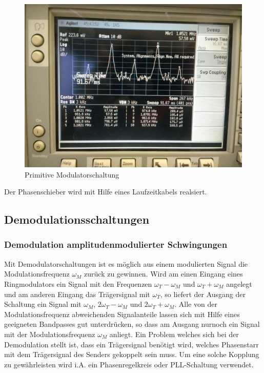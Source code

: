 \begin{figure}
	\centering
	\includegraphics[width=\textwidth]{img/Aufgabenteil_b.jpg}
	\caption{Primitive Modulatorschaltung}
	\label{abb:ringMod}
\end{figure}

Der Phasenschieber wird mit Hilfe eines Laufzeitkabels realsiert.

\subsection{Demodulationsschaltungen}
\subsubsection{Demodulation amplitudenmodulierter Schwingungen}
Mit Demodulatorschaltungen ist es möglich aus einem modulierten Signal die Modulationsfrequenz $\omega_M$ zurück zu gewinnen.
Wird am einen Eingang eines Ringmodulators ein Signal mit den Frequenzen $\omega_T - \omega_M$ und $\omega_T + \omega_M$ angelegt und am anderen Eingang das Trägersignal mit $\omega_T$, so liefert der Ausgang der Schaltung ein Signal mit
$\omega_M$, $2\omega_T - \omega_M$ und $2\omega_T + \omega_M$. Alle von der Modulationsfrequenz abweichenden Signalanteile lassen sich mit Hilfe eines geeigneten Bandpasses gut unterdrücken, so dass am Ausgang nurnoch ein Signal mit der Modulationsfrequenz $\omega_M$ anliegt. Ein Problem welches sich bei der Demodulation stellt ist, dass ein Trägersignal benötigt wird, welches Phasenstarr mit dem Trägersignal des Senders gekoppelt sein muss. Um eine solche Kopplung zu gewährleisten wird i.A. ein Phasenregelkreis oder PLL-Schaltung verwendet. 

